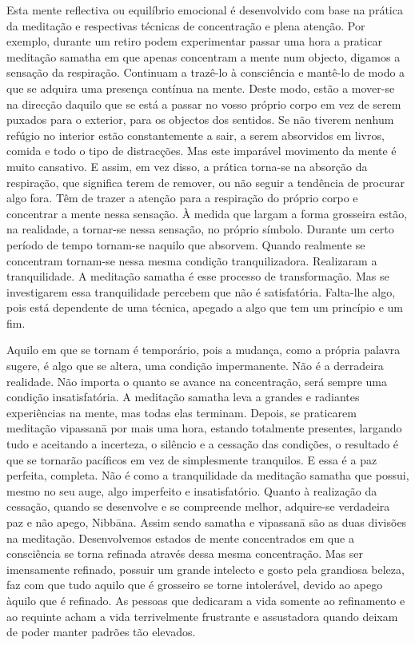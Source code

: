 Esta mente reflectiva ou equilíbrio emocional é desenvolvido com base na prática da meditação e respectivas técnicas
de concentração e plena atenção. Por exemplo, durante um
retiro podem experimentar passar uma hora a praticar meditação samatha em que apenas concentram a mente num objecto,
digamos a sensação da respiração. Continuam a trazê-lo à
consciência e mantê-lo de modo a que se adquira uma presença
contínua na mente.
Deste modo, estão a mover-se na direcção daquilo que se
está a passar no vosso próprio corpo em vez de serem puxados
para o exterior, para os objectos dos sentidos. Se não tiverem
nenhum refúgio no interior estão constantemente a sair, a
serem absorvidos em livros, comida e todo o tipo de distracções.
Mas este imparável movimento da mente é muito cansativo.
E assim, em vez disso, a prática torna-se na absorção da
respiração, que significa terem de remover, ou não seguir a
tendência de procurar algo fora. Têm de trazer a atenção para
a respiração do próprio corpo e concentrar a mente nessa
sensação. À medida que largam a forma grosseira estão, na
realidade, a tornar-se nessa sensação, no próprio símbolo.
Durante um certo período de tempo tornam-se naquilo que
absorvem. Quando realmente se concentram tornam-se nessa
mesma condição tranquilizadora. Realizaram a tranquilidade.
A meditação samatha é esse processo de transformação.
Mas se investigarem essa tranquilidade percebem que
não é satisfatória. Falta-lhe algo, pois está dependente de uma
técnica, apegado a algo que tem um princípio e um fim.

Aquilo em que se tornam é temporário, pois a mudança, como
a própria palavra sugere, é algo que se altera, uma condição
impermanente. Não é a derradeira realidade. Não importa o
quanto se avance na concentração, será sempre uma condição
insatisfatória. A meditação samatha leva a grandes e radiantes
experiências na mente, mas todas elas terminam.
Depois, se praticarem meditação vipassanā por mais uma
hora, estando totalmente presentes, largando tudo e aceitando
a incerteza, o silêncio e a cessação das condições, o resultado
é que se tornarão pacíficos em vez de simplesmente tranquilos.
E essa é a paz perfeita, completa. Não é como a tranquilidade
da meditação samatha que possui, mesmo no seu auge, algo
imperfeito e insatisfatório. Quanto à realização da cessação,
quando se desenvolve e se compreende melhor, adquire-se
verdadeira paz e não apego, Nibbāna.
Assim sendo samatha e vipassanā são as duas divisões
na meditação. Desenvolvemos estados de mente concentrados
em que a consciência se torna refinada através dessa mesma
concentração. Mas ser imensamente refinado, possuir um
grande intelecto e gosto pela grandiosa beleza, faz com que
tudo aquilo que é grosseiro se torne intolerável, devido ao
apego àquilo que é refinado. As pessoas que dedicaram a vida
somente ao refinamento e ao requinte acham a vida terrivelmente frustrante e assustadora quando deixam de poder
manter padrões tão elevados.


